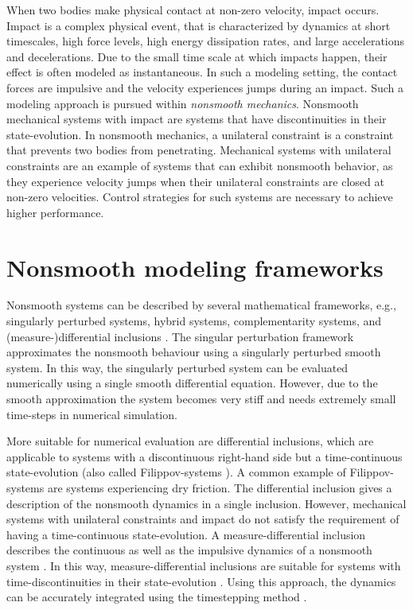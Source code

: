 \documentclass[../DC2017114Bouma.tex]{subfiles}
\begin{document}
When two bodies make physical contact at non-zero velocity, impact occurs. Impact is a complex physical event, that is characterized by dynamics at short timescales, high force levels, high energy dissipation rates, and large accelerations and decelerations. Due to the small time scale at which impacts happen, their effect is often modeled as instantaneous. In such a modeling setting, the contact forces are impulsive and the velocity experiences jumps during an impact. Such a modeling approach is pursued within \textit{nonsmooth mechanics}. Nonsmooth mechanical systems with impact are systems that have discontinuities in their state-evolution. In nonsmooth mechanics, a unilateral constraint is a constraint that prevents two bodies from penetrating. Mechanical systems with unilateral constraints are an example of systems that can exhibit nonsmooth behavior, as they experience velocity jumps when their unilateral constraints are closed at non-zero velocities. Control strategies for such systems are necessary to achieve higher performance.

\section{Nonsmooth modeling frameworks}
Nonsmooth systems can be described by several mathematical frameworks, e.g., singularly perturbed systems, hybrid systems, complementarity systems, and (measure-)differential inclusions \cite{Leine2004}. The singular perturbation framework approximates the nonsmooth behaviour using a singularly perturbed smooth system. In this way, the singularly perturbed system can be evaluated numerically using a single smooth differential equation. However, due to the smooth approximation the system becomes very stiff and needs extremely small time-steps in numerical simulation. 

More suitable for numerical evaluation are differential inclusions, which are applicable to systems with a discontinuous right-hand side but a time-continuous state-evolution (also called Filippov-systems \cite{Filippov1988}). A common example of Filippov-systems are systems experiencing dry friction. The differential inclusion gives a description of the nonsmooth dynamics in a single inclusion. However, mechanical systems with unilateral constraints and impact do not satisfy the requirement of having a time-continuous state-evolution. A measure-differential inclusion describes the continuous as well as the impulsive dynamics of a nonsmooth system \cite{Leine2008b}. In this way, measure-differential inclusions are suitable for systems with time-discontinuities in their state-evolution \cite{Moreau1988,Brogliato1999}. Using this approach, the dynamics can be accurately integrated using the timestepping method \cite{Wouwa}. 
\end{document}
